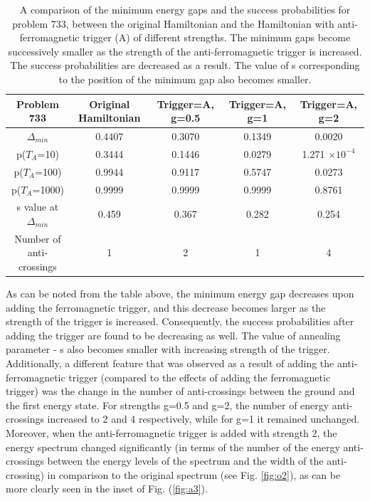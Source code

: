 \documentclass[../main.tex]{subfiles}
\begin{document}
\begin{table}[H]
\centering
\renewcommand{\arraystretch}{1.5}
\begin{tabular}{|c|c|c|c|c|}
\hline 
Problem 733 & Original Hamiltonian & Trigger=A, g=0.5 & Trigger=A, g=1 & Trigger=A, g=2 \\ 
\hline 
$\Delta_{min}$ & 0.4407 & 0.3070 & 0.1349 & 0.0020 \\ 
\hline 
p($T_A$=10) & 0.3444 & 0.1446 & 0.0279 & 1.271 $\times 10^{-4}$ \\ 
\hline 
p($T_A$=100) & 0.9944 & 0.9117 & 0.5747 & 0.0273 \\ 
\hline 
p($T_A$=1000) & 0.9999 & 0.9999 & 0.9999 & 0.8761 \\ 
\hline 
s value at $\Delta_{min}$ & 0.459 & 0.367 & 0.282 & 0.254 \\ 
\hline
Number of anti-crossings & 1 & 2 & 1 & 4 \\
\hline
\end{tabular} 
\caption{A comparison of the minimum energy gaps and the success probabilities for problem 733, between the original Hamiltonian and the Hamiltonian with anti-ferromagnetic trigger (A) of different strengths. The minimum gaps become successively smaller as the strength of the anti-ferromagnetic trigger is increased. The success probabilities are decreased as a result. The value of s corresponding to the position of the minimum gap also becomes smaller.}
\label{tab:a1}
\end{table}
As can be noted from the table above, the minimum energy gap decreases upon adding the ferromagnetic trigger, and this decrease becomes larger as the strength of the trigger is increased. Consequently, the success probabilities after adding the trigger are found to be decreasing as well. The value of annealing parameter - s also becomes smaller with increasing strength of the trigger.\\
Additionally, a different feature that was observed as a result of adding the anti-ferromagnetic trigger (compared to the effects of adding the ferromagnetic trigger) was the change in the number of anti-crossings between the ground and the first energy state. For strengths g=0.5 and g=2, the number of energy anti-crossings increased to 2 and 4 respectively, while for g=1 it remained unchanged. Moreover, when the anti-ferromagnetic trigger is added with strength 2, the energy spectrum changed significantly (in terms of the number of the energy anti-crossings between the energy levels of the spectrum and the width of the anti-crossing) in comparison to the original spectrum (see Fig. \ref{fig:o2}), as can be more clearly seen in the inset of Fig. (\ref{fig:a3}).\\
\end{document}
